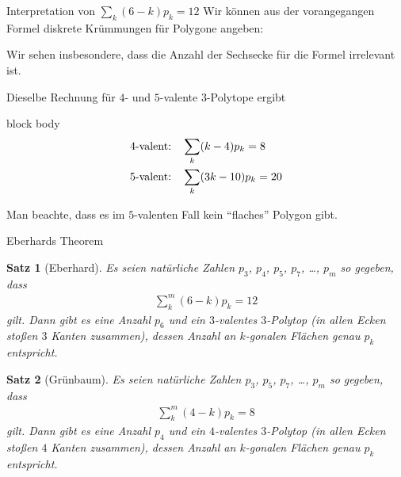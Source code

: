 \documentclass[10pt, notheorems]{beamer}
\newtheorem{theorem}{Satz}[section]
\begin{document}
\begin{frame}{Interpretation von $\sum_k (6 - k) p_k = 12$}
  Wir können aus der vorangegangen Formel diskrete Krümmungen für Polygone angeben:

  \centering
  
  \pause
  \justifying
  Wir sehen insbesondere, dass die Anzahl der Sechsecke für die Formel irrelevant ist.
\end{frame}

\begin{frame}
  Dieselbe Rechnung für $4$- und $5$-valente $3$-Polytope ergibt

  \medskip
  \begin{beamercolorbox}[sep=-10pt,center,shadow=true,rounded=true]{block body}
    \begin{align*}
      4\text{-valent:\quad}&\sum_k (k-4)p_k = 8\\
      5\text{-valent:\quad}&\sum_k (3k-10)p_k = 20
    \end{align*}
  \end{beamercolorbox}
  \medskip

  Man beachte, dass es im $5$-valenten Fall kein ``flaches'' Polygon gibt.
\end{frame}

\begin{frame}{{\sc Eberhard}s Theorem}
  \begin{theorem}[\sc Eberhard]
    Es seien natürliche Zahlen $p_3$, $p_4$, $p_5$, $p_7$, \dots, $p_m$ so gegeben, dass
    \begin{align*}
      \sum_k^m (6 - k) p_k = 12
    \end{align*}
    gilt. Dann gibt es eine Anzahl $p_6$ und ein $3$-valentes $3$-Polytop (in allen Ecken stoßen $3$ Kanten zusammen), dessen Anzahl an $k$-gonalen Flächen genau $p_k$ entspricht.   
  \end{theorem}
  \pause
  \begin{theorem}[\sc Grünbaum]
    Es seien natürliche Zahlen $p_3$, $p_5$, $p_7$, \dots, $p_m$ so gegeben, dass
    \begin{align*}
      \sum_k^m (4 - k) p_k = 8
    \end{align*}
    gilt. Dann gibt es eine Anzahl $p_4$ und ein $4$-valentes $3$-Polytop (in allen Ecken stoßen $4$ Kanten zusammen), dessen Anzahl an $k$-gonalen Flächen genau $p_k$ entspricht.   
  \end{theorem}
\end{frame}
\end{document}
